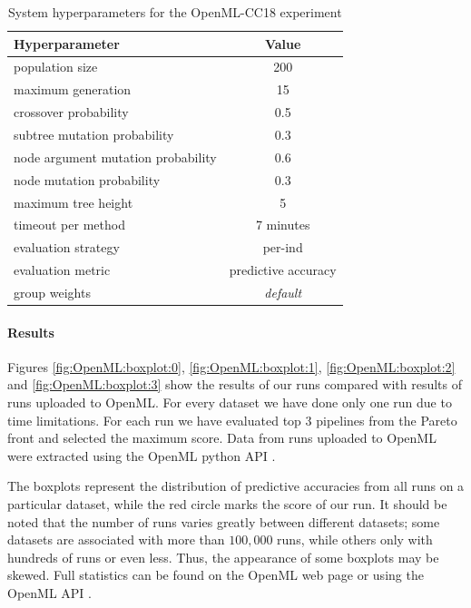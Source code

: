 \begin{table}[ht]

\centering
\caption{System hyperparameters for the OpenML-CC18 experiment}\label{tab04:exp3:setting}
\begin{tabular}{l c}
\toprule
\textbf{\upshape Hyperparameter} & \textbf{Value} \\
\midrule
population size & 200 \\
maximum generation & 15 \\
crossover probability & 0.5 \\
subtree mutation probability & 0.3 \\
node argument mutation probability & 0.6 \\
node mutation probability & 0.3 \\
maximum tree height & 5 \\
timeout per method  & 7 minutes \\
evaluation strategy & per-ind \\
evaluation metric & predictive accuracy \\
group weights & \textit{default} \\
\bottomrule

\end{tabular}

\end{table}

\paragraph{Results}
Figures \ref{fig:OpenML:boxplot:0}, \ref{fig:OpenML:boxplot:1},
\ref{fig:OpenML:boxplot:2} and \ref{fig:OpenML:boxplot:3} show the results
of our runs compared with results of runs uploaded to OpenML. For every dataset
we have done only one run due to time limitations. For each run we have
evaluated top 3 pipelines from the Pareto front and selected the maximum score.
Data from runs uploaded to OpenML were extracted using the OpenML python API
\citep{openmlcc18api}.

The boxplots represent the distribution of predictive accuracies from all runs
on a particular dataset, while the red circle marks the score of our run.
It should be noted that the number of runs varies
greatly between different datasets; some datasets are associated with more
than $100,000$ runs, while others only with hundreds of runs or even less. Thus,
the appearance of some boxplots may be skewed. Full statistics can be found on
the OpenML web page or using the OpenML API \citep{openmlcc18, openmlcc18docs}.

